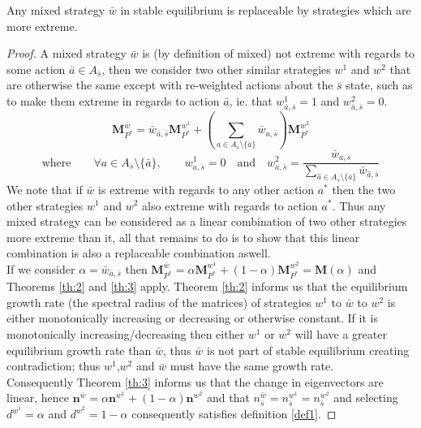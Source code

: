 \begin{lemma}\label{lemma:part1}
Any mixed strategy $\bar{w}$ in stable equilibrium is replaceable by strategies which are more extreme.
\end{lemma}
\begin{proof}
A mixed strategy $\bar{w}$ is (by definition of mixed) not extreme with regards to some action $\bar{a}\in A_{\bar{s}}$, then we consider two other similar strategies $w^1$ and $w^2$ that are otherwise the same except with re-weighted actions about the $\bar{s}$ state, such as to make them extreme in regards to action $\bar{a}$, ie. that $w^1_{\bar{a},\bar{s}}=1$ and $w^2_{\bar{a},\bar{s}}=0$.
$$ \mathbf{M}_{P^*}^{\bar{w}} = \bar{w}_{\bar{a},\bar{s}}\mathbf{M}_{P^*}^{w^1} + \left(\sum_{a\in A_{\bar{s}}\setminus \{\bar{a}\}} \bar{w}_{a,\bar{s}}\right)\mathbf{M}_{P^*}^{w^2} $$
$$\text{where}\qquad \forall a\in A_{\bar{s}}\setminus \{\bar{a}\},\qquad  w^1_{a,\bar{s}}=0 \quad\text{and}\quad w^2_{a,\bar{s}} = \frac{\bar{w}_{a,\bar{s}}}{\sum_{\hat{a}\in A_{\bar{s}}\setminus \{\bar{a}\}} \bar{w}_{\hat{a},\bar{s}}} $$
We note that if $\bar{w}$ is extreme with regards to any other action $a^*$ then the two other strategies $w^1$ and $w^2$ also extreme with regards to action $a^*$.
Thus any mixed strategy can be considered as a linear combination of two other strategies more extreme than it, all that remains to do is to show that this linear combination is also a replaceable combination aswell.\\
If we consider $\alpha = \bar{w}_{\bar{a},\bar{s}}$ then $\mathbf{M}_{P^*}^{\bar{w}} = \alpha\mathbf{M}_{P^*}^{w^1} + (1-\alpha)\mathbf{M}_{P^*}^{w^2} = \mathbf{M}(\alpha)$ and Theorems \ref{th:2} and \ref{th:3} apply.
Theorem \ref{th:2} informs us that the equilibrium growth rate (the spectral radius of the matrices) of strategies $w^1$ to $\bar{w}$ to $w^2$ is either monotonically increasing or decreasing or otherwise constant.
If it is monotonically increasing/decreasing then either $w^1$ or $w^2$ will have a greater equilibrium growth rate than $\bar{w}$, thus $\bar{w}$ is not part of stable equilibrium creating contradiction; thus $w^1$,$w^2$ and $\bar{w}$ must have the same growth rate.\\
Consequently Theorem \ref{th:3} informs us that the change in eigenvectors are linear, hence $\mathbf{n}^{\bar{w}} = \alpha \mathbf{n}^{w^1} + (1-\alpha)\mathbf{n}^{w^2}$ and that $n^{\bar{w}}_{\bar{s}} = n^{w^1}_{\bar{s}} = n^{w^2}_{\bar{s}}$ and selecting $d^{w^1} = \alpha$ and $d^{w^2} = 1-\alpha$ consequently satisfies definition \ref{def1}.
\end{proof}


